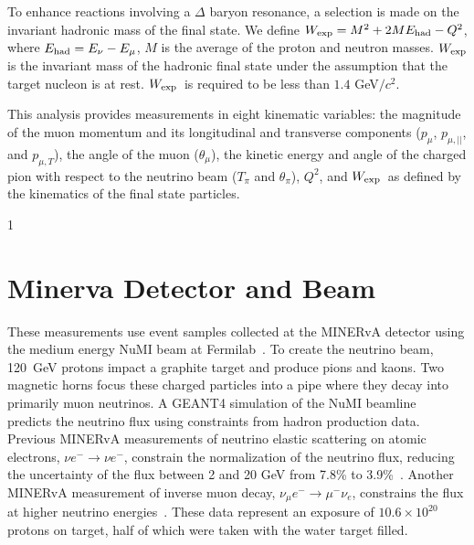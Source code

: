 \documentclass[aps,preprint,showpacs,superscriptaddress,letterpaper,showkeys,superscriptaddress,nofootinbib,floatfix]{revtex4-1}
\newcommand{\Wexp}{\ensuremath{W_{\rm\scriptstyle exp}}}
\newcommand{\Ehad}{\ensuremath{E_{\rm\scriptstyle had}}}
\newcommand{\gevcsq}{GeV$/c^2$}
\newcommand{\aaronComment}[1]{{\noindent \bf\color{orange} \small [AMB: #1]}}
\newcommand{\firstReviewAdd}[1]{{\bf\color{blue} \protect #1}}
\newcommand{\firstReviewStrike}[1]{{\bf\color{blue}\protect \sout{#1}}}
\newcommand{\firstReviewComment}[1]{{\noindent \bf\color{blue} \small [DAH: #1]}}
\newcommand{\firstRefereeAdd}[1]{{\bf\color{green} \protect #1}}
\newcommand{\firstRefereeStrike}[1]{{\bf\color{green}\protect \sout{#1}}}
\newcommand{\showSections}[0]{0}
\renewcommand{\aaronComment}[1]{}
\renewcommand{\firstReviewComment}[1]{}
\renewcommand{\firstReviewAdd}[1]{\protect #1}
\renewcommand{\firstReviewStrike}[1]{}
\renewcommand{\firstRefereeAdd}[1]{\protect #1}
\renewcommand{\firstRefereeStrike}[1]{}
\begin{document}
To \firstRefereeStrike{focus on}\firstRefereeAdd{enhance} reactions \firstRefereeStrike{in the}\firstRefereeAdd{involving a} $\Delta$ \firstRefereeAdd{baryon }resonance\firstRefereeStrike{ region}, a selection is \firstRefereeStrike{also} made on the invariant hadronic mass of the final state.  We define $\Wexp=M^2+2M\Ehad-Q^2$, where $\Ehad=E_\nu-E_\mu$, $M$ is the average of the proton and neutron masses.  $\Wexp$ is the invariant mass of the hadronic final state under the assumption that 
\firstReviewAdd{the} target nucleon is at rest.  \Wexp\ is required to be less than $1.4$ \gevcsq.

This analysis provides measurements in eight kinematic variables: the magnitude of the muon momentum and its longitudinal and transverse components ($p_\mu$, $p_{\mu,||}$, and $p_{\mu,T}$), the angle of the muon ($\theta_\mu$), the kinetic energy and angle of the charged pion with respect to the neutrino beam ($T_\pi$ and $\theta_\pi$),  $Q^2$, and \Wexp\ as defined by the kinematics of the final state particles.

\if\showSections1 \section{Minerva Detector and Beam} \fi
The\firstReviewAdd{se} measurements \firstReviewStrike{presented in this paper} use event samples collected at the MINERvA detector using the medium energy NuMI beam at \firstRefereeStrike{the Fermi National \firstReviewAdd{Accelerator} Laboratory}\firstRefereeAdd{Fermilab}~\cite{Aliaga:2013uqz}.  To create the neutrino beam, 120~GeV protons impact a \firstReviewStrike{fixed} graphite target and produce pions and kaons.  Two magnetic horns focus \firstRefereeStrike{and direct} these charged particles into a pipe where they decay into primarily muon neutrinos. A GEANT4 simulation of the NuMI beamline~\cite{Aliaga:2016oaz} predicts the neutrino flux using constraints from hadron production data.  Previous MINERvA measurements of \firstRefereeStrike{the} neutrino elastic scattering on atomic electrons, $\nu e^- \rightarrow \nu e^-$, constrain the normalization of the neutrino flux, reducing the uncertainty of the flux between 2 and 20 GeV from 7.8\% to 3.9\%~\cite{Valencia:2019mkf,MINERvA:2022vmb}. Another MINERvA measurement of inverse muon decay, $\nu_\mu e^{-}\rightarrow \mu^-\nu_e$, constrains the flux at higher neutrino energies~\cite{MINERvA:2021dhf}. 
\firstReviewAdd{These data represent an \firstRefereeStrike{total} exposure of $10.6\times 10^{20}$ protons on target, half of which were taken with the water target \firstRefereeStrike{full and half with the target empty}\firstRefereeAdd{filled}.}
\end{document}

